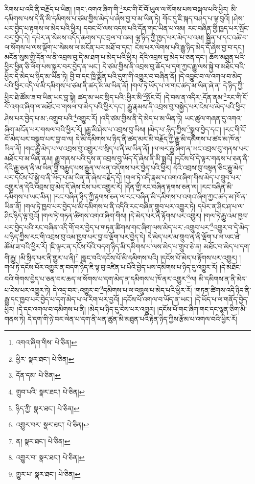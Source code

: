 རིགས་པ་འདི་ནི་བརྗོད་པ་ཡིན། །གང་:འགའ་ཞིག་གི་\footnote{འགའ་ཞིག་གིས་  པེ་ཅིན། }རང་གི་ངོ་བོ་ཡུལ་ལ་སོགས་པས་བསྐལ་པའི་ཕྱིར། མི་དམིགས་པས་དེ་ནི་མི་དམིགས་པ་ཙམ་གྱིས་མེད་པ་ཞེས་བྱ་བ་མ་ཡིན་ཏེ། གོང་དུ་ཇི་སྐད་བཤད་པ་ལྟ་བུའོ། །ཤེས་པར་བྱེད་པ་རྟགས་ལ་མེད་པའི་ཕྱིར། དབང་པོ་ལས་འདས་པའི་དོན་གང་ཡིན་པ་འམ། རང་བཞིན་གྱི་ཁྱད་པར་སྤོང་བར་བྱེད་དེ། དཔེར་ན་སེམས་འདོད་ཆགས་དང་བྲལ་བ་འམ། ལྷ་ཉིད་ཀྱི་ཁྱད་པར་མེད་པ་འམ། སྦྱིན་པ་དང་འཚེ་བ་ལ་སོགས་པ་ལས་ལྡོག་པ་སེམས་ལ་མངོན་པར་མཐོ་བ་དང་། ངེས་པར་ལེགས་པའི་རྒྱུ་ཉིད་མེད་དོ་ཞེས་བྱ་བ་དང་། མངོན་སུམ་གྱི་དོན་ལ་ནི་འབྲས་བུ་དེ་མ་ཐག་པ་མེད་པའི་ཕྱིར། དེའི་འབྲས་བུ་མེད་པ་ཅན་དང་། ཆོས་མཐུན་པའི་ཕྱིར་ཕྱིན་ཅི་ལོག་པས་སྐུར་བར་བྱེད་ན་ཡང་། དེ་ཙམ་གྱིས་ནི་འབྲས་བུ་ཆོད་པ་དག་ཀྱང་རྒྱུ་ལས་སྐྱེ་བ་མཐོང་བའི་ཕྱིར་དེ་མེད་པ་ཉིད་མ་ཡིན་ཏེ། བྱི་བ་དང་ཁྱི་སྨྱོན་པའི་དུག་གི་འགྱུར་བ་བཞིན་ནོ། །དེ་འབྱུང་བ་ལ་འགལ་བ་མེད་པའི་ཕྱིར་འདི་ལ་མི་དམིགས་པ་ཙམ་ནི་ཚད་མ་མ་ཡིན་ནོ། །གལ་ཏེ་ཡོད་པ་ལ་གང་ཚད་མ་ཡིན་ཞེ་ན། དེ་ཉིད་ཀྱི་ཕྱིར་ཐེ་ཚོམ་ཟ་བ་ཡིན་ཡང་བླ་སྟེ། ཚད་མ་ཡང་སྲིད་པའི་:ཕྱིར་མི་\footnote{ཕྱིར་  སྣར་ཐང་།  པེ་ཅིན། }སྤོང་ངོ། །དེ་བས་ན་འདིར་:དོན་ནམ་\footnote{དོན་དམ་  པེ་ཅིན། }རང་གི་ངོ་བོ་འགའ་ཞིག་ལ་མཐོང་བ་གསལ་བ་མེད་པའི་ཕྱིར་དང་། རྒྱུ་རྣམས་ནི་འབྲས་བུ་བསྐྱེད་པར་ངེས་པ་མེད་པའི་ཕྱིར། ཤེས་པར་བྱེད་པ་མ་:འགྲུབ་པའི་\footnote{གྲུབ་པའི་  སྣར་ཐང་།  པེ་ཅིན། }འགྱུར་རོ། །འདི་ཙམ་གྱིས་ནི་དེ་མེད་པ་མ་ཡིན་ཏེ། ཡང་ཚུལ་གཞན་དུ་འགའ་ཞིག་མངོན་པར་གསལ་བའི་ཕྱིར་རོ། །རྒྱུ་མི་ཤེས་པ་འབྲས་བུ་ཡིས། །མེད་པ་:ཉིད་ཀྱིས་\footnote{ཉིད་ཀྱི་  སྣར་ཐང་།  པེ་ཅིན། }སྒྲུབ་བྱེད་དང་། །རང་གི་ངོ་བོ་མེད་པར་བསྒྲུབ་པར་བྱ་བ་ལ། དེ་མི་དམིགས་པ་ཉིད་ནི་ཚད་མར་མི་བརྗོད་ཀྱི་རྒྱུ་མི་དམིགས་པ་ཚད་མ་ཁོ་ན་ཡིན་ནོ། །གང་རྒྱུ་མེད་པ་ལ་འབྲས་བུ་འགྱུར་བ་སྲིད་པ་ནི་མ་ཡིན་ནོ། །ལ་ལར་རྒྱུ་ཞིག་ན་ཡང་འབྲས་བུ་གནས་པར་མཐོང་བ་མ་ཡིན་ནམ། རྒྱུ་གནས་པའི་དུས་ན་འབྲས་བུ་ཡོད་དོ་ཞེས་ནི་མི་སྨྲའོ། །དངོས་པོ་དེ་ལྟར་གནས་པ་ཅན་ནི་དེའི་རྒྱུ་ཅན་ནི་མ་ཡིན་གྱི་བརྒྱུད་པས་རྒྱུན་ལ་ཕན་འདོགས་པར་བྱེད་པའི་ཕྱིར། དེའི་འབྲས་བུ་བསྟན་ཅིང་རྒྱུ་མེད་པར་དངོས་པོ་སྐྱེ་བ་ནི་ཡོད་པ་མ་ཡིན་ནོ་ཞེས་བརྗོད་དོ། །གལ་ཏེ་འདི་རྣམ་པ་འགའ་ཞིག་གིས་མེད་པ་གྲུབ་པར་འགྱུར་ན་དེའི་འབྲས་བུ་མེད་དོ་ཞེས་ངེས་པར་འགྱུར་རོ། །དོན་གྱི་རང་བཞིན་རྟགས་ཅན་ལ། །རང་བཞིན་མི་དམིགས་པ་ཡང་མིན། །རང་བཞིན་ཉིད་ཀྱི་རྟགས་ཅན་ལ་རང་བཞིན་མི་དམིགས་པ་འགའ་ཞིག་ཀྱང་ཚད་མ་ཁོ་ན་ཡིན་ནོ། །གལ་ཏེ་ཁྱབ་པར་བྱེད་པ་མི་དམིགས་པ་ནི་འདིའི་རང་བཞིན་གྲུབ་པར་འགྱུར་ཏེ། དཔེར་ན་ཤིང་ཤ་པ་ལ་ཤིང་ཉིད་ལྟ་བུའོ། །གལ་ཏེ་གཏན་ཚིགས་འགའ་ཞིག་གིས། །དེ་མེད་པར་ནི་རྟོགས་པར་འགྱུར། །གལ་ཏེ་རྒྱུ་འམ་ཁྱབ་པར་བྱེད་པའི་རང་བཞིན་འདི་གོ་བར་བྱེད་པ་གཏན་ཚིགས་གང་ཞིག་ལས་མེད་པར་:འགྲུབ་པར་\footnote{འགྱུར་བར་  སྣར་ཐང་།  པེ་ཅིན། }འགྱུར་བ་དེ་མེད་པ་ཉིད་ཀྱིས་རང་གི་འབྲས་བུ་འམ་ཁྱབ་པར་བྱ་བ་ལྡོག་པར་བྱེད་དེ། དེ་མེད་པར་མ་གྲུབ་ན་ནི་ལྡོག་པ་ལ་ཡང་ཐེ་ཚོམ་ཟ་བའི་ཕྱིར་རོ། །ཇི་ལྟར་ན་དངོས་པོའི་བདག་ཉིད་མི་དམིགས་པ་ལས་མེད་པ་གྲུབ་ཅེ་ན། མཐོང་བ་མེད་པ་དག་གི་རྒྱུ། །མི་སྲིད་པར་ནི་གྱུར་པ་ནི།\footnote{ན།  སྣར་ཐང་།  པེ་ཅིན། } །སྣང་བའི་དངོས་པོ་མི་དམིགས་པའི། །དངོས་པོ་མེད་པ་རྟོགས་པར་འགྱུར། །གལ་ཏེ་དངོས་པོར་འགྱུར་ན་བདག་ཉིད་ཇི་ལྟ་བུ་འཛིན་པ་པོའི་བྱེད་པས་དམིགས་པ་ཉིད་དུ་འགྱུར་རོ། །དེ་མཐོང་བའི་གེགས་བྱེད་པ་ཅན་བར་ཆད་ལ་སོགས་པ་དག་མེད་ན་དམིགས་པ་ཁོ་ནར་འགྱུར་\footnote{འགྱུར་བ་  སྣར་ཐང་།  པེ་ཅིན། }ལ། མི་དམིགས་ན་ནི་མེད་པ་ངེས་པར་འགྱུར་ཏེ། དེ་འདྲ་བར་:འགྱུར་བ་\footnote{གྱུར་པ་  སྣར་ཐང་།  པེ་ཅིན། }དམིགས་པ་ལ་འཁྲུལ་པ་མེད་པའི་ཕྱིར་རོ། །གཏན་ཚིགས་འདི་ཉིད་ནི་རྒྱུ་དང་ཁྱབ་པར་བྱེད་པ་དག་མེད་པ་ལ་རིག་པར་བྱའོ། །དངོས་པོ་འགལ་བ་ཡོད་ན་ཡང་། །དེ་ཡོད་པ་ལ་གནོད་བྱེད་ཕྱིར། །དེ་དང་འགལ་བ་དམིགས་པ་ནི། །མེད་པ་ཉིད་དུ་ངེས་པར་འགྱུར། །དངོས་པོ་གང་ཞིག་གང་དང་ལྷན་ཅིག་མི་གནས་ཏེ། དེ་དག་གི་ཉེ་བར་ལེན་པ་དག་ནི་ཕན་ཚུན་མི་མཐུན་པའི་རྟེན་ཉིད་ཀྱིས་རྩོམ་པ་འགལ་བའི་ཕྱིར་རོ། 